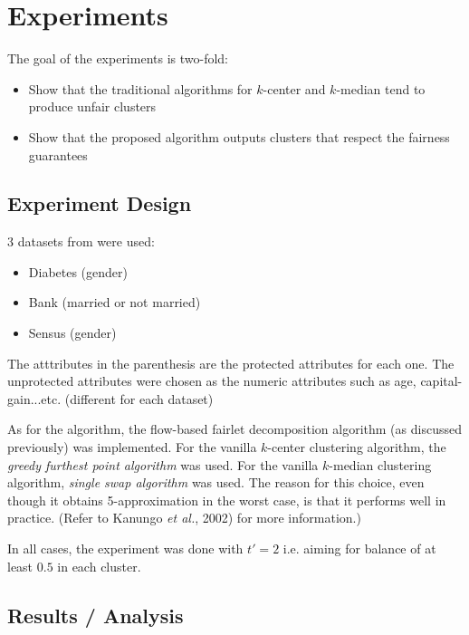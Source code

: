 \chapter{Experiments}

The goal of the experiments is two-fold:

\begin{itemize}
	\item Show that the traditional algorithms for $k$-center and $k$-median tend to produce unfair clusters

	\item Show that the proposed algorithm outputs clusters that respect the fairness guarantees
\end{itemize}


\section{Experiment Design}

3 datasets from \cite{Lichman2013} were used:
\begin{itemize}
	\item Diabetes (gender)
	\item Bank (married or not married)
	\item Sensus (gender)
\end{itemize}

The atttributes in the parenthesis are the protected attributes for each one. The unprotected attributes were chosen as the numeric attributes such as age, capital-gain...etc. (different for each dataset)

As for the algorithm, the flow-based fairlet decomposition algorithm (as discussed previously) was implemented.
For the vanilla $k$-center clustering algorithm, the {\it greedy furthest point algorithm\cite{Gonzalez1985}} was used.
For the vanilla $k$-median clustering algorithm, {\it single swap algorithm\cite{Arya2004}} was used. The reason for this choice, even though it obtains 5-approximation in the worst case, is that it performs well in practice. (Refer to Kanungo {\it et al.}, 2002) for more information.)

In all cases, the experiment was done with $t' = 2$ i.e. aiming for balance of at least $0.5$ in each cluster.

\newpage
\section{Results / Analysis}

